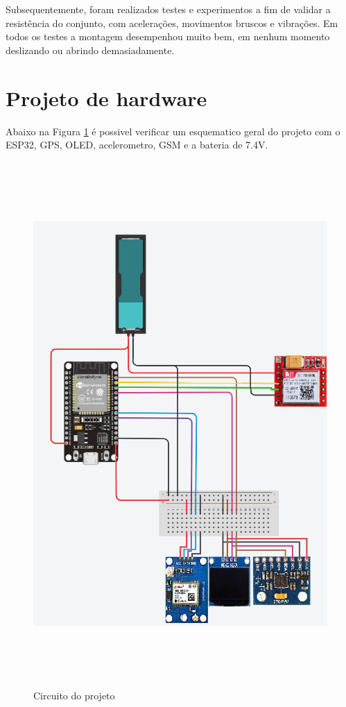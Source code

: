 Subsequentemente, foram realizados testes e experimentos a fim de validar a resistência do conjunto, com acelerações, movimentos bruscos e vibrações. Em todos os testes a montagem desempenhou muito bem, em nenhum momento deslizando ou abrindo demasiadamente.

\newpage
\section{Projeto de hardware}

Abaixo na Figura \ref{fig:diagrama_hardware} é possivel verificar um esquematico geral do projeto com o ESP32, GPS, OLED, acelerometro, GSM e a bateria de 7.4V.
\begin{figure}[!h]
\centering
\includegraphics[width=15cm, height=20cm]{capitulos/Figuras/Circuito.png}
\caption{Circuito do projeto}
\label{fig:diagrama_hardware}
\end{figure}

